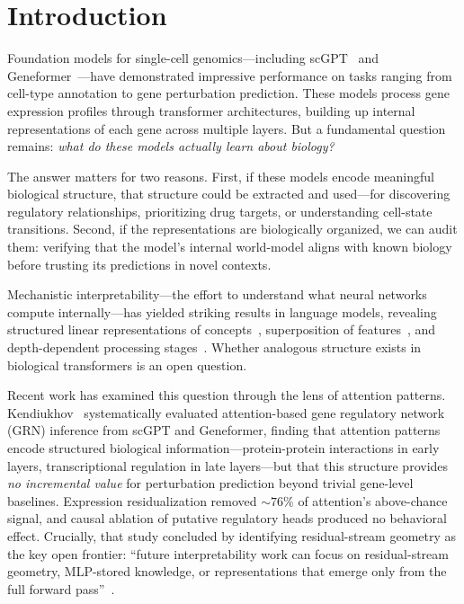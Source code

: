 \documentclass[10pt,twocolumn]{article}
\begin{document}
\section{Introduction}

Foundation models for single-cell genomics---including scGPT~\citep{cui2024scgpt} and Geneformer~\citep{theodoris2023transfer}---have demonstrated impressive performance on tasks ranging from cell-type annotation to gene perturbation prediction.
These models process gene expression profiles through transformer architectures, building up internal representations of each gene across multiple layers.
But a fundamental question remains: \emph{what do these models actually learn about biology?}

The answer matters for two reasons.
First, if these models encode meaningful biological structure, that structure could be extracted and used---for discovering regulatory relationships, prioritizing drug targets, or understanding cell-state transitions.
Second, if the representations are biologically organized, we can audit them: verifying that the model's internal world-model aligns with known biology before trusting its predictions in novel contexts.

Mechanistic interpretability---the effort to understand what neural networks compute internally---has yielded striking results in language models, revealing structured linear representations of concepts~\citep{park2023linear}, superposition of features~\citep{elhage2022toy}, and depth-dependent processing stages~\citep{nanda2023progress}.
Whether analogous structure exists in biological transformers is an open question.

Recent work has examined this question through the lens of attention patterns.
Kendiukhov~\citep{kendiukhov2025attention} systematically evaluated attention-based gene regulatory network (GRN) inference from scGPT and Geneformer, finding that attention patterns encode structured biological information---protein-protein interactions in early layers, transcriptional regulation in late layers---but that this structure provides \emph{no incremental value} for perturbation prediction beyond trivial gene-level baselines.
Expression residualization removed ${\sim}76\%$ of attention's above-chance signal, and causal ablation of putative regulatory heads produced no behavioral effect.
Crucially, that study concluded by identifying residual-stream geometry as the key open frontier: ``future interpretability work can focus on residual-stream geometry, MLP-stored knowledge, or representations that emerge only from the full forward pass''~\citep{kendiukhov2025attention}.
\end{document}

